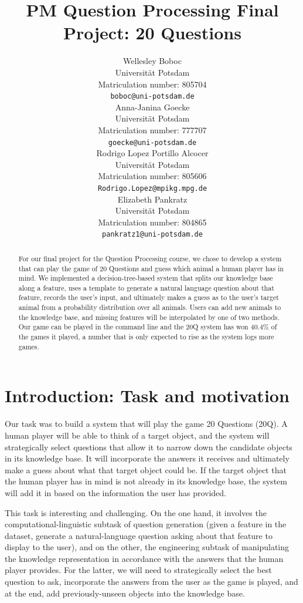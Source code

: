 \documentclass[11pt,a4paper]{article}
\title{PM Question Processing Final Project: 20 Questions}
\author{Wellesley Boboc \\
Universit{\"a}t Potsdam \\
Matriculation number: 805704 \\
\texttt{boboc@uni-potsdam.de} \\\And
Anna-Janina Goecke \\
Universit{\"a}t Potsdam \\
Matriculation number: 777707 \\
\texttt{goecke@uni-potsdam.de} \\\AND
Rodrigo Lopez Portillo Alcocer \\
Universit{\"a}t Potsdam \\
Matriculation number: 805606 \\
\texttt{Rodrigo.Lopez@mpikg.mpg.de} \\\And
Elizabeth Pankratz \\
Universit{\"a}t Potsdam \\
Matriculation number: 804865 \\
\texttt{pankratz1@uni-potsdam.de} \\}
\date{}
\begin{document}
\maketitle

\begin{abstract}
For our final project for the Question Processing course, we chose to develop a system that can play the game of 20 Questions and guess which animal a human player has in mind.
We implemented a decision-tree-based system that splits our knowledge base along a feature, uses a template to generate a natural language question about that feature, records the user's input, and ultimately makes a guess as to the user's target animal from a probability distribution over all animals. 
Users can add new animals to the knowledge base, and missing features will be interpolated by one of two methods. 
Our game can be played in the command line and the 20Q system has won 40.4\% of the games it played, a number that is only expected to rise as the system logs more games.
\end{abstract}

\section{Introduction: Task and motivation}
\label{sec:intro}

Our task was to build a system that will play the game 20 Questions (20Q).
A human player will be able to think of a target object, and the system will strategically select questions that allow it to narrow down the candidate objects in its knowledge base.
It will incorporate the answers it receives and ultimately make a guess about what that target object could be.
If the target object that the human player has in mind is not already in its knowledge base, the system will add it in based on the information the user has provided.

This task is interesting and challenging.
On the one hand, it involves the computational-linguistic subtask of question generation (given a feature in the dataset, generate a natural-language question asking about that feature to display to the user), and on the other, the engineering subtask of manipulating the knowledge representation in accordance with the answers that the human player provides.
For the latter, we will need to strategically select the best question to ask, incorporate the answers from the user as the game is played, and at the end, add previously-unseen objects into the knowledge base.
\end{document}
